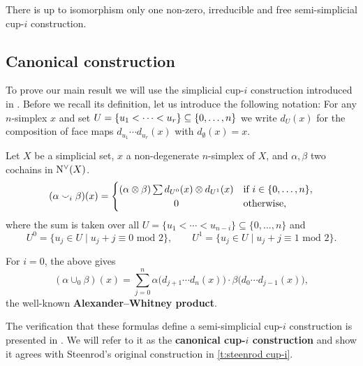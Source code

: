 \begin{theorem}
	There is up to isomorphism only one non-zero, irreducible and free semi-simplicial \mbox{cup-$i$} construction.
\end{theorem}

\subsection{Canonical construction}

To prove our main result we will use the simplicial \mbox{cup-$i$} construction introduced in \cite{medina2023fast_sq}.
Before we recall its definition, let us introduce the following notation:
For any $n$-simplex $x$ and set $U = \{u_1 < \dots < u_r\} \subseteq \set[big]{0,\dots,n}$ we write $d_U(x)$ for the composition of face maps $d_{u_1}\! \dotsm d_{u_r}(x)$ with $d_{\emptyset}(x) = x$.

\begin{definition}\label{d:my cup-i}
	Let $X$ be a simplicial set, $x$ a non-degenerate $n$-simplex of $X$, and $\alpha, \beta$ two cochains in $\operatorname{N^{\vee}}(X)$.
	\[
	(\alpha \cup_i \beta)(x) =
	\begin{cases}
		(\alpha \ot \beta) \sum d_{U^0}(x) \ot d_{U^1}(x) &
		\text{if } i \in \{0, \dots, n\}, \\
		\hfil 0 &
		\text{otherwise},
	\end{cases}
	\]
	where the sum is taken over all $U = \{u_1 < \cdots < u_{n-i}\} \subseteq \{0, \dots, n\}$ and
	\[
	U^0 = \{u_j \in U \mid u_j + j \equiv 0 \text{ mod } 2\}, \qquad
	U^1 = \{u_j \in U \mid u_j + j \equiv 1 \text{ mod } 2\}.
	\]
\end{definition}

\begin{example}
	For $i = 0$, the above gives
	\[
	(\alpha \cup_0 \beta)(x) =
	\sum_{j=0}^n \alpha \big(d_{j+1} \cdots d_{n}(x)\big) \cdot \beta \big(d_{0} \cdots d_{j-1}(x)\big),
	\]
	the well-known \textbf{Alexander--Whitney product}.
\end{example}

The verification that these formulas define a semi-simplicial \mbox{cup-$i$} construction is presented in \cite{medina2023fast_sq}.
We will refer to it as the \textbf{canonical \mbox{cup-$i$} construction} and show it agrees with Steenrod's original construction in \cref{t:steenrod cup-i}.